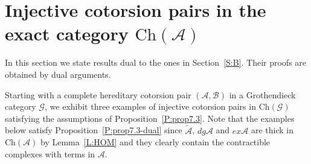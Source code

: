 \documentclass[11pt,a4paper,reqno]{amsart}
\newcommand{\A}{\mathcal{A}}
\newcommand{\B}{\mathcal{B}}
\newcommand{\G}{\mathcal{G}}
\newcommand{\Ch}{\mathrm{Ch}}
\theoremstyle{plain}
\theoremstyle{definition}
\theoremstyle{remark}
\begin{document}
 \section{Injective cotorsion pairs in the exact category $\Ch(\A)$}

 In this section we state results dual to the ones in Section~\ref{S:B}. Their proofs are obtained  by dual arguments.

%
Starting with a complete hereditary cotorsion pair $(\A, \B)$ in a Grothendieck  category $\G$, we exhibit three examples of injective cotorsion pairs in $\Ch(\G)$ satisfying the assumptions of Proposition~\ref{P:prop7.3}. Note that the examples below satisfy Proposition~\ref{P:prop7.3-dual} since $\tilde{\A}$, $dg\A$ and $ex\A$  are thick in $\Ch(\A)$ by Lemma~\ref{L:HOM} and they clearly contain the contractible complexes with terms in $\A$.
\end{document}
